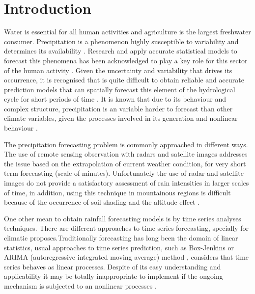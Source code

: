 \chapter{Introduction} 
\doublespacing
\label{cap:ini}
\vspace{-2cm}


Water is essential for all human activities and agriculture is the largest freshwater consumer. Precipitation is a phenomenon highly susceptible to variability and determines its availability \cite{calzadilla2013climate}. Research and apply accurate statistical models to forecast this phenomena has been acknowledged to play a key role for this sector of the human activity \cite{toth2000comparison}. Given the uncertainty and variability that drives its occurrence, it is recognised that is quite difficult to obtain reliable and accurate prediction models that can spatially forecast this element of the hydrological cycle for short periods of time \cite{brath1997role}. It is known that due to its behaviour and complex structure, precipitation is an variable harder to forecast than other climate variables, given the processes involved in its generation and nonlinear behaviour \cite{jha2018evaluation}.

The precipitation forecasting problem is commonly approached in different ways. The use of remote sensing observation with radars and satellite images addresses the issue based on the extrapolation of current weather condition, for very short term forecasting (scale of minutes). Unfortunately the use of radar and satellite images do not provide a satisfactory assessment of rain intensities in larger scales of time, in addition, using this technique in mountainous regions is difficult because of the occurrence of soil shading and the altitude effect \cite{toth2000comparison}. 

One other mean to obtain rainfall forecasting models is by time series analyses techniques. There are different approaches to time series forecasting, specially for climatic proposes.Traditionally forecasting has long been the domain of linear statistics, usual approaches to time series prediction, such as Box-Jenkins \citeyear{box1976time} or ARIMA (autoregressive integrated moving average) method \cite{pankratz1983forecasting}, considers that time series behaves as linear processes. Despite of its easy understanding and applicability it may be totally inappropriate to implement if the ongoing mechanism is subjected to an nonlinear processes \cite{zhang2003time}. 

